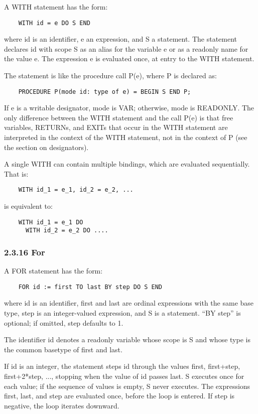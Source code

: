 \documentclass[10pt]{article}
\begin{document}
  A WITH statement has the form: 
\begin{verbatim}
    WITH id = e DO S END
\end{verbatim}
 where id is an identifier, e an expression, and S a statement. The statement declares id with scope S as an alias for the variable e or as a readonly name for the value e. The expression e is evaluated once, at entry to the WITH statement. 


  The statement is like the procedure call P(e), where P is declared as: 
\begin{verbatim}
    PROCEDURE P(mode id: type of e) = BEGIN S END P;
\end{verbatim}
 If e is a writable designator, mode is VAR; otherwise, mode is READONLY. The only difference between the WITH statement and the call P(e) is that free variables, RETURNs, and EXITs that occur in the WITH statement are interpreted in the context of the WITH statement, not in the context of P (see the section on designators). 


 A single WITH can contain multiple bindings, which are evaluated sequentially. That is: 
\begin{verbatim}
    WITH id_1 = e_1, id_2 = e_2, ...
\end{verbatim}
 is equivalent to: 
\begin{verbatim}
    WITH id_1 = e_1 DO
      WITH id_2 = e_2 DO ....
\end{verbatim}



 
\subsubsection*{2.3.16 For}


  A FOR statement has the form: 
\begin{verbatim}
    FOR id := first TO last BY step DO S END
\end{verbatim}
 where id is an identifier, first and last are ordinal expressions with the same base type, step is an integer-valued expression, and S is a statement. ``BY step'' is optional; if omitted, step defaults to 1. 


  The identifier id denotes a readonly variable whose scope is S and whose type is the common basetype of first and last. 


  If id is an integer, the statement steps id through the values first, first+step, first+2*step, ..., stopping when the value of id passes last. S executes once for each value; if the sequence of values is empty, S never executes. The expressions first, last, and step are evaluated once, before the loop is entered. If step is negative, the loop iterates downward. 
\end{document}
